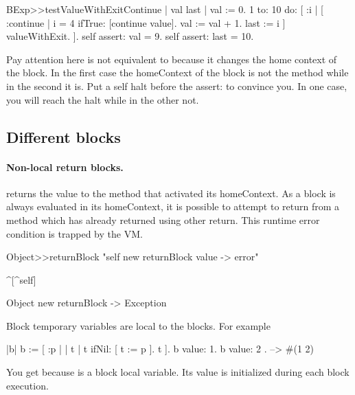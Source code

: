 \documentclass[a4paper,10pt,twoside]{book}
\begin{document}
\begin{code}{}
BExp>>testValueWithExitContinue
	| val last |	
	val := 0. 
	1 to: 10 do: [ :i |
		[ :continue |
			i = 4 ifTrue: [continue value].
			val := val + 1.
			last := i
		] valueWithExit.
	].
	self assert: val = 9.
	self assert: last = 10.	
\end{code}

Pay attention here  is not equivalent to  because it changes the home context of the block. 
In the first case the homeContext of the block is not the method  while in the second it is.
Put a self halt before the assert: to convince you. In one case, you will reach the halt while in the other not. 





\subsection{Different blocks} 

\paragraph{Non-local return blocks.} \ct{[:x :y| x*x. ^ x + y]} returns the value to the method that activated its homeContext. As a block is always evaluated in its homeContext, it is possible to attempt to return from a method which has already returned using other return. This runtime error condition is trapped by the VM.

\begin{code}{}
Object>>returnBlock
	"self new returnBlock value -> error"

	^[^self]

Object new returnBlock
-> Exception
\end{code}	
	
	



Block temporary variables are local to the blocks. For example


\begin{code}{}
|b|
b := [ :p |
	| t |
	t ifNil: [ t := p ].
	t ].
{ b value: 1. b value: 2 }.
   -->  #(1 2)
\end{code}

You get  because  is a block local variable. Its value is initialized during each block execution.
\end{document}
